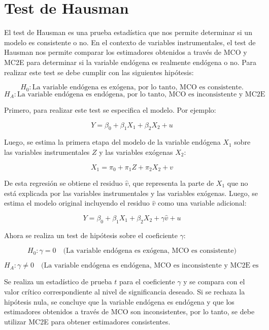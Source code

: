 \documentclass[
]{book}
\begin{document}
\section{Test de Hausman}\label{test-de-hausman}

El test de Hausman es una prueba estadística que nos permite determinar si un modelo es consistente o no. En el contexto de variables instrumentales, el test de Hausman nos permite comparar los estimadores obtenidos a través de MCO y MC2E para determinar si la variable endógena es realmente endógena o no.
Para realizar este test se debe cumplir con las siguientes hipótesis:

\[
H_0: \text{La variable endógena es exógena, por lo tanto, MCO es consistente.}
\]
\[
H_A: \text{La variable endógena es endógena, por lo tanto, MCO es inconsistente y MC2E es consistente.}
\]

Primero, para realizar este test se especifica el modelo. Por ejemplo:

\[
Y = \beta_0 + \beta_1X_1 + \beta_2X_2 + u
\]

Luego, se estima la primera etapa del modelo de la variable endógena \(X_1\) sobre las variables instrumentales \(Z\) y las variables exógenas \(X_2\):

\[
X_1 = \pi_0 + \pi_1Z + \pi_2X_2 + v
\]

De esta regresión se obtiene el residuo \(\hat{v}\), que representa la parte de \(X_1\) que no está explicada por las variables instrumentales y las variables exógenas. Luego, se estima el modelo original incluyendo el residuo \(\hat{v}\) como una variable adicional:

\[
Y = \beta_0 + \beta_1X_1 + \beta_2X_2 + \gamma\hat{v} + u
\]

Ahora se realiza un test de hipótesis sobre el coeficiente \(\gamma\):

\[
H_0: \gamma = 0 \quad \text{(La variable endógena es exógena, MCO es consistente)}
\]

\[
H_A: \gamma \neq 0 \quad \text{(La variable endógena es endógena, MCO es inconsistente y MC2E es consistente)}
\]

Se realiza un estadístico de prueba \(t\) para el coeficiente \(\gamma\) y se compara con el valor crítico correspondiente al nivel de significancia deseado. Si se rechaza la hipótesis nula, se concluye que la variable endógena es endógena y que los estimadores obtenidos a través de MCO son inconsistentes, por lo tanto, se debe utilizar MC2E para obtener estimadores consistentes.
\end{document}
